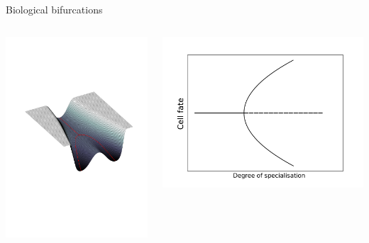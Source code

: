 \documentclass[presentation]{beamer}
\begin{document}
\begin{frame}[label={sec:org32b3f5a}]{Biological bifurcations}
\begin{columns}
\begin{column}{0.5\columnwidth}
\includegraphics[width=\linewidth,trim={8cm 27cm 6cm 23cm},clip]{./surface2.pdf}
\end{column}

\begin{column}{0.5\columnwidth}
\begin{center}
\includegraphics[width=.9\linewidth]{./pitchfork.pdf}
\end{center}
\end{column}
\end{columns}
\end{frame}
\end{document}
